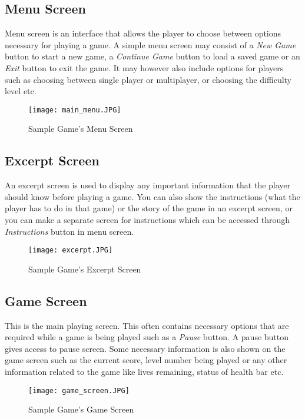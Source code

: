 \documentclass[11pt,fleqn]{book} %
\begin{document}
\subsection{Menu Screen}
Menu screen is an interface that allows the player to choose between options necessary for playing a game. A simple menu screen may consist of a \textit{New Game} button to start a new game, a \textit{Continue Game} button to load a saved game or an \textit{Exit} button to exit the game. It may however also include options for players such as choosing between single player or multiplayer, or choosing the difficulty level etc. 
\begin{figure}[ht]
            \centering
            \texttt{[image: main\_menu.JPG]}
            \caption{Sample Game's Menu Screen}
            \label{fig:my_label}
\end{figure} 
\subsection{Excerpt Screen}
An excerpt screen is  used to display any important information that the player should know before playing a game. You can also show the instructions (what the player has to do in that game) or the story of the game in an excerpt screen, or you can make a separate screen for instructions which can be accessed through \textit{Instructions} button in menu screen.
 \begin{figure}[ht]
            \centering
            \texttt{[image: excerpt.JPG]}
            \caption{Sample Game's Excerpt Screen}
            \label{fig:my_label}
\end{figure} 
\subsection{Game Screen}
This is the main playing screen. This often contains necessary options that are required while a game is being played such as a \textit{Pause} button. A pause button gives access to pause screen. Some necessary information is also shown on the game screen such as the current score, level number being played or any other information related to the game like lives remaining, status of health bar etc.
\begin{figure}[ht]
            \centering
            \texttt{[image: game\_screen.JPG]}
            \caption{Sample Game's Game Screen}
            \label{fig:my_label}
\end{figure} 
\end{document}
